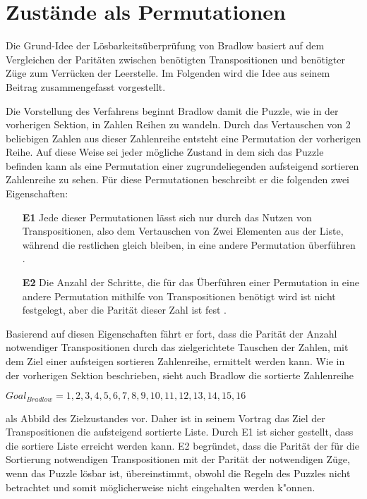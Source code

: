 
\section{Zustände als Permutationen} %
\label{sec:Permutation}
Die Grund-Idee der Lösbarkeitsüberprüfung von Bradlow basiert auf dem Vergleichen der Paritäten zwischen benötigten Transpositionen und benötigter Züge zum Verrücken der Leerstelle. Im Folgenden wird die Idee aus seinem Beitrag \autocite{Unsolvable-14-15-Numberphile-YT:online} zusammengefasst vorgestellt.\WNL

Die Vorstellung des Verfahrens beginnt Bradlow damit die Puzzle, wie in der vorherigen Sektion, in Zahlen Reihen zu wandeln. Durch das Vertauschen von 2 beliebigen Zahlen aus dieser Zahlenreihe entsteht eine Permutation der vorherigen Reihe. Auf diese Weise sei jeder mögliche Zustand in dem sich das Puzzle befinden kann als eine Permutation einer zugrundeliegenden aufsteigend sortieren Zahlenreihe zu sehen. Für diese Permutationen beschreibt er die folgenden zwei Eigenschaften:
\begin{enumerate}
	\item[\textbf{E1}] Jede dieser Permutationen lässt sich nur durch das Nutzen von Transpositionen, also dem Vertauschen von Zwei Elementen aus der Liste, während die restlichen gleich bleiben, in eine andere Permutation überführen \cite[Vgl.][7min,07sec]{Unsolvable-14-15-Numberphile-YT:online}.
	\item[\textbf{E2}] Die Anzahl der Schritte, die für das Überführen einer Permutation in eine andere Permutation mithilfe von Transpositionen benötigt wird ist nicht festgelegt, aber die Parität dieser Zahl ist fest \cite[Vgl.][10min,13sec]{Unsolvable-14-15-Numberphile-YT:online}.
\end{enumerate}
Basierend auf diesen Eigenschaften fährt er fort, dass die Parität der Anzahl notwendiger Transpositionen durch das zielgerichtete Tauschen der Zahlen, mit dem Ziel einer aufsteigen sortieren Zahlenreihe, ermittelt werden kann. Wie in der vorherigen Sektion beschrieben, sieht auch Bradlow die sortierte Zahlenreihe
\begin{center}
	$Goal_{Bradlow} = {1,2,3,4,5,6,7,8,9,10,11,12,13,14,15,16}$
\end{center}
als Abbild des Zielzustandes vor. Daher ist in seinem Vortrag das Ziel der Transpositionen die aufsteigend sortierte Liste. Durch E1 ist sicher gestellt, dass die sortiere Liste erreicht werden kann. E2 begründet, dass die Parität der für die Sortierung notwendigen Transpositionen mit der Parität der notwendigen Züge, wenn das Puzzle lösbar ist, übereinstimmt, obwohl die Regeln des Puzzles nicht betrachtet und somit möglicherweise nicht eingehalten werden k"onnen.\WNL
